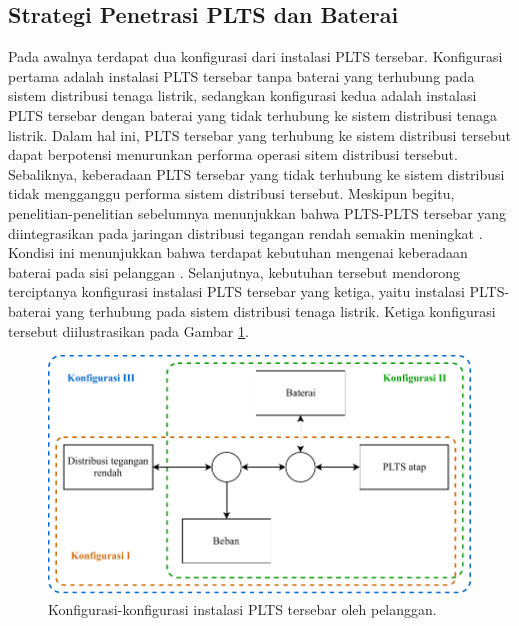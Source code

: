 {{{{\subsection{Strategi Penetrasi PLTS dan Baterai}
Pada awalnya terdapat dua konfigurasi dari instalasi PLTS tersebar. Konfigurasi pertama adalah instalasi PLTS tersebar tanpa baterai yang terhubung pada sistem distribusi tenaga listrik, sedangkan konfigurasi kedua adalah instalasi PLTS tersebar dengan baterai yang tidak terhubung ke sistem distribusi tenaga listrik. Dalam hal ini, PLTS tersebar yang terhubung ke sistem distribusi tersebut dapat berpotensi menurunkan performa operasi sitem distribusi tersebut. Sebaliknya, keberadaan PLTS tersebar yang tidak terhubung ke sistem distribusi tidak mengganggu performa sistem distribusi tersebut. Meskipun begitu, penelitian-penelitian sebelumnya menunjukkan bahwa PLTS-PLTS tersebar yang diintegrasikan pada jaringan distribusi tegangan rendah semakin meningkat \cite{IEApvps2020,irena2020}. Kondisi ini menunjukkan bahwa terdapat kebutuhan mengenai keberadaan baterai pada sisi pelanggan \cite{Nourai2010,Roberts2011}. Selanjutnya, kebutuhan tersebut mendorong terciptanya konfigurasi instalasi PLTS tersebar yang ketiga, yaitu instalasi PLTS-baterai yang terhubung pada sistem distribusi tenaga listrik. Ketiga konfigurasi tersebut diilustrasikan pada Gambar \ref{diagrampltsbateraigrid}.
\begin{figure}[!h]
	\centering
	\includegraphics[width=1\textwidth]{Fig/diagrampltsbateraigrid}
	\caption{Konfigurasi-konfigurasi instalasi PLTS tersebar oleh pelanggan.}
	\label{diagrampltsbateraigrid}
\end{figure}

}}}}
